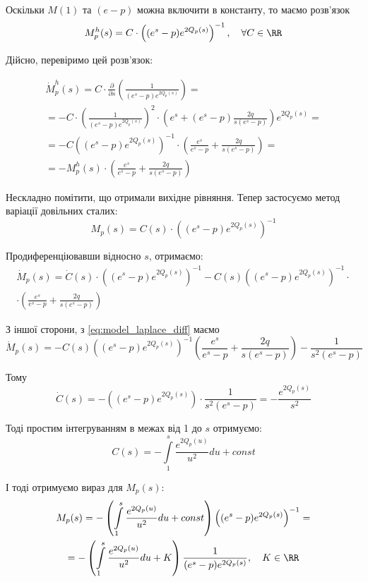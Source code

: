 Оскільки $M(1)$ та $(e-p)$ можна включити в константу, то маємо розв'язок
\begin{equation}
\label{eq:model_laplace_homogen_sol}
M_{p}^{h} (s) = C \cdot \left((e^s - p)  e^{2Q_p(s)}\right)^{-1}, \quad \forall C \in \RR
\end{equation}

Дійсно, перевіримо цей розв'язок:

\begin{gather*}
\dot M_{p}^{h} (s) = C \cdot \frac{\partial}{\partial s} \left(\frac{1}{(e^s - p)  e^{2Q_p(s)}}\right)=\\
= - C \cdot \left(\frac{1}{(e^s - p)  e^{2Q_p(s)}}\right)^2 \cdot \left(e^s  + (e^s - p) \frac{2q}{s(e^s - p)}   \right) e^{2Q_p(s)} =\\
= -C \left((e^s - p)  e^{2Q_p(s)}\right)^{-1} \cdot \left(\frac{e^s}{e^s - p}  + \frac{2q}{s(e^s - p)}   \right) =\\
= - M_{p}^{h}(s) \cdot \left(\frac{e^s}{e^s - p}  + \frac{2q}{s(e^s - p)}   \right)
\end{gather*}

Нескладно помітити, що отримали вихідне рівняння. Тепер застосуємо метод варіації довільних сталих:
$$
M_{p}(s) = C(s) \cdot \left((e^s - p)  e^{2Q_p(s)}\right)^{-1} 
$$

Продиференціювавши відносно $s$, отримаємо:
\begin{gather*}
\dot M_{p}(s) = \dot C(s) \cdot \left((e^s - p)  e^{2Q_p(s)}\right)^{-1} -C(s) \left((e^s - p)  e^{2Q_p(s)}\right)^{-1} \cdot \\
\cdot \left(\frac{e^s}{e^s - p}  + \frac{2q}{s(e^s - p)}   \right) 
\end{gather*}

З іншої сторони, з \eqref{eq:model_laplace_diff} маємо
$$
\dot M_{p}(s) = - C(s) \left((e^s - p)  e^{2Q_p(s)}\right)^{-1}  \left(\frac{e^s}{e^s - p} + \frac{2q}{s(e^s - p)}\right) - \frac{1}{s^2(e^s - p)} \quad	
$$

Тому
$$
\dot C(s) = - \left((e^s - p)  e^{2Q_p(s)}\right) \cdot  \frac{1}{s^2(e^s - p)} =  - \frac{e^{2Q_p(s)}}{s^2}
$$

Тоді простим інтегруванням в межах від 1 до $s$ отримуємо:
\begin{equation}
C(s) = -  \int\limits_1^s \frac{e^{2Q_p(u)}}{u^2} du + const
\end{equation}

І тоді отримуємо вираз для $M_{p}(s)$:
\begin{gather*}
M_{p}(s)=- \left( \int\limits_1^s \frac{e^{2Q_p(u)}}{u^2} du + const \right) \left((e^s - p)  e^{2Q_p(s)}\right)^{-1}  =\\
= - \left( \int\limits_1^s \frac{e^{2Q_p(u)}}{u^2} du + K \right) \frac{1}{(e^s - p)  e^{2Q_p(s)}}, \quad K \in \RR
\end{gather*}

